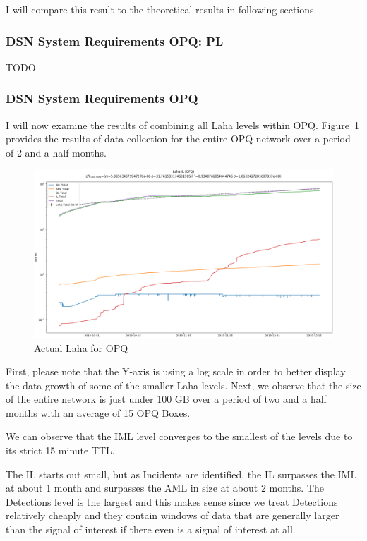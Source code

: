 I will compare this result to the theoretical results in following sections.

\subsubsection{DSN System Requirements OPQ: PL}

TODO

\subsubsection{DSN System Requirements OPQ}

I will now examine the results of combining all Laha levels within OPQ. Figure~\ref{fig:actual_laha_opq} provides the results of data collection for the entire OPQ network over a period of 2 and a half months.

\begin{figure}[H]
    \centering
    \includegraphics[width=\linewidth]{figures/actual_laha_opq.png}
    \caption{Actual Laha for OPQ}
    \label{fig:actual_laha_opq}
\end{figure}

First, please note that the Y-axis is using a log scale in order to better display the data growth of some of the smaller Laha levels. Next, we observe that the size of the entire network is just under 100 GB over a period of two and a half months with an average of 15 OPQ Boxes.

We can observe that the IML level converges to the smallest of the levels due to its strict 15 minute TTL.

The IL starts out small, but as Incidents are identified, the IL surpasses the IML at about 1 month and surpasses the AML in size at about 2 months. The Detections level is the largest and this makes sense since we treat Detections relatively cheaply and they contain windows of data that are generally larger than the signal of interest if there even is a signal of interest at all.

